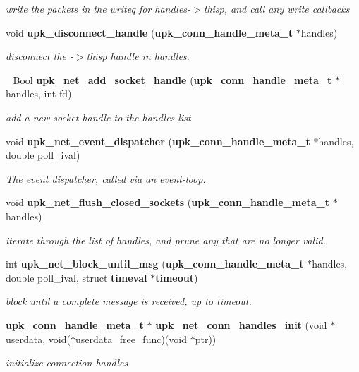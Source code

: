 \begin{DoxyCompactItemize}
\begin{DoxyCompactList}\small\item\em write the packets in the writeq for handles-\/$>$thisp, and call any write callbacks \end{DoxyCompactList}\item 
void {\bf upk\_\-disconnect\_\-handle} ({\bf upk\_\-conn\_\-handle\_\-meta\_\-t} $\ast$handles)
\begin{DoxyCompactList}\small\item\em disconnect the -\/$>$thisp handle in handles. \end{DoxyCompactList}\item 
\_\-Bool {\bf upk\_\-net\_\-add\_\-socket\_\-handle} ({\bf upk\_\-conn\_\-handle\_\-meta\_\-t} $\ast$handles, int fd)
\begin{DoxyCompactList}\small\item\em add a new socket handle to the handles list \end{DoxyCompactList}\item 
void {\bf upk\_\-net\_\-event\_\-dispatcher} ({\bf upk\_\-conn\_\-handle\_\-meta\_\-t} $\ast$handles, double poll\_\-ival)
\begin{DoxyCompactList}\small\item\em The event dispatcher, called via an event-\/loop. \end{DoxyCompactList}\item 
void {\bf upk\_\-net\_\-flush\_\-closed\_\-sockets} ({\bf upk\_\-conn\_\-handle\_\-meta\_\-t} $\ast$handles)
\begin{DoxyCompactList}\small\item\em iterate through the list of handles, and prune any that are no longer valid. \end{DoxyCompactList}\item 
int {\bf upk\_\-net\_\-block\_\-until\_\-msg} ({\bf upk\_\-conn\_\-handle\_\-meta\_\-t} $\ast$handles, double poll\_\-ival, struct {\bf timeval} $\ast${\bf timeout})
\begin{DoxyCompactList}\small\item\em block until a complete message is received, up to timeout. \end{DoxyCompactList}\item 
{\bf upk\_\-conn\_\-handle\_\-meta\_\-t} $\ast$ {\bf upk\_\-net\_\-conn\_\-handles\_\-init} (void $\ast$userdata, void($\ast$userdata\_\-free\_\-func)(void $\ast$ptr))
\begin{DoxyCompactList}\small\item\em initialize connection handles \end{DoxyCompactList}\item 

\end{DoxyCompactItemize}
